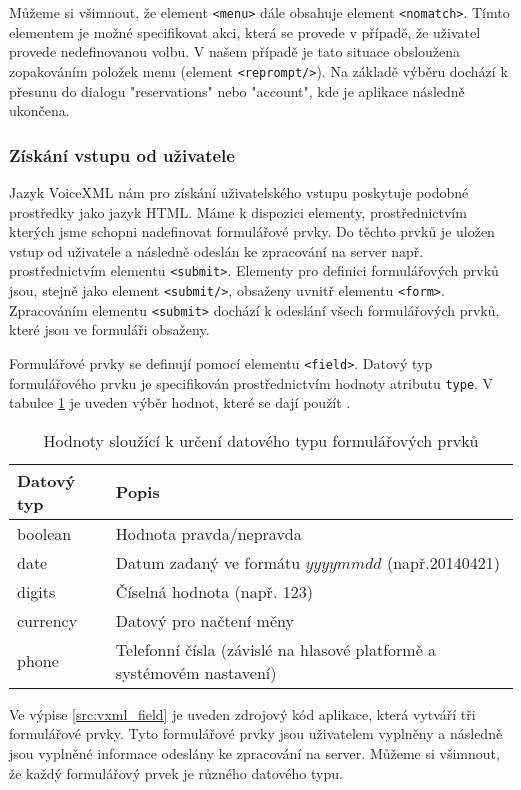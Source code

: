 \documentclass[ing,male,java,dept460]{diploma}						%
\begin{document}
Můžeme si všimnout, že element \texttt{<menu>} dále obsahuje element \texttt{<nomatch>}. Tímto elementem je možné specifikovat akci, která se provede v případě, že uživatel provede nedefinovanou volbu. V našem případě je tato situace obsloužena zopakováním položek menu (element \texttt{<reprompt/>}). Na základě výběru dochází k přesunu do dialogu "reservations" nebo "account", kde je aplikace následně ukončena.

\subsubsection{Získání vstupu od uživatele}
Jazyk VoiceXML nám pro získání uživatelského vstupu poskytuje podobné prostředky jako jazyk HTML. Máme k dispozici elementy, prostřednictvím kterých jsme schopni nadefinovat formulářové prvky. Do těchto prvků je uložen vstup od uživatele a následně odeslán ke zpracování na server např. prostřednictvím elementu \texttt{<submit>}. Elementy pro definici formulářových prvků jsou, stejně jako element \texttt{<submit/>}, obsaženy uvnitř elementu \texttt{<form>}. Zpracováním elementu \texttt{<submit>} dochází k odeslání všech formulářových prvků, které jsou ve formuláři obsaženy.

Formulářové prvky se definují pomocí elementu \texttt{<field>}. Datový typ formulářového prvku je specifikován prostřednictvím hodnoty atributu \texttt{type}. V tabulce \ref{tab:form_fields_datatypes} je uveden výběr hodnot, které se dají použít \cite{vxml_org}.

\begin{table}
	\centering
	\begin{tabular}{|l|l|}
		\hline
		Datový typ & Popis \\
		\hline
		boolean & Hodnota pravda/nepravda  \\
		\hline
		date & Datum zadaný ve formátu $yyyymmdd$ (např.20140421)   \\
		\hline
		digits & Číselná hodnota (např. 123)  \\
		\hline
		currency & Datový pro načtení měny  \\
		\hline
		phone & Telefonní čísla (závislé na hlasové platformě a systémovém nastavení)  \\
		\hline
	\end{tabular}
	\caption{Hodnoty sloužící k určení datového typu formulářových prvků}
	\label{tab:form_fields_datatypes}
\end{table}

Ve výpise \ref{src:vxml_field} je uveden zdrojový kód aplikace, která vytváří tři formulářové prvky. Tyto formulářové prvky jsou uživatelem vyplněny a následně jsou vyplněné informace odeslány ke zpracování na server. Můžeme si všimnout, že každý formulářový prvek je různého datového typu.
\end{document}
